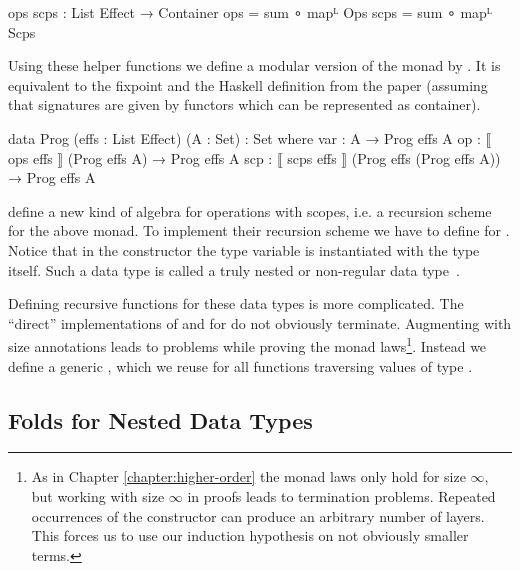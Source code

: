 \begin{code}
ops scps : List Effect → Container
ops   = sum ∘ mapᴸ Ops
scps  = sum ∘ mapᴸ Scps
\end{code}
Using these helper functions we define a modular version of the monad by
\textcite{DBLP:conf/lics/PirogSWJ18}.
It is equivalent to the fixpoint and the Haskell definition from the paper
(assuming that signatures are given by functors which can be represented as
container).

\begin{code}
data Prog (effs : List Effect) (A : Set) : Set where
  var  :  A                                          → Prog effs A
  op   :  ⟦ ops   effs  ⟧ (Prog effs A)              → Prog effs A
  scp  :  ⟦ scps  effs  ⟧ (Prog effs (Prog effs A))  → Prog effs A
\end{code}
\textcite{DBLP:conf/lics/PirogSWJ18} define a new kind of algebra for operations
with scopes, i.e. a recursion scheme for the above monad.
To implement their recursion scheme we have to define \AgdaFunction{<\$>} for 
\AgdaSpace{}\AgdaSpace{}.
Notice that in the  constructor the type variable
 is instantiated with the type 
\AgdaSpace{}\AgdaSpace{}
itself.
Such a data type is called a truly nested or non-regular data
type~\cite{DBLP:conf/mpc/BirdM98}.

Defining recursive functions for these data types is more complicated.
The ``direct'' implementations of \AgdaFunction{<\$>} and \AgdaFunction{>>=} for
\AgdaSpace{}\AgdaSpace{}
do not obviously terminate.
Augmenting
\AgdaSpace{}\AgdaSpace{}
with size annotations leads to problems while
proving the monad laws\footnote{As in Chapter \ref{chapter:higher-order} the
  monad laws only hold for size $\infty$, but working with size $\infty$ in
  proofs leads to termination problems.
  Repeated occurrences of the  constructor can
  produce an arbitrary number of
  \AgdaSpace{} layers.
  This forces us to use our induction hypothesis on not obviously smaller
  terms.}.
Instead we define a generic , which we reuse for all
functions traversing values of type
\AgdaSpace{}\AgdaSpace{}.


\subsection{Folds for Nested Data Types}
\label{scoped-algebra:fold}

